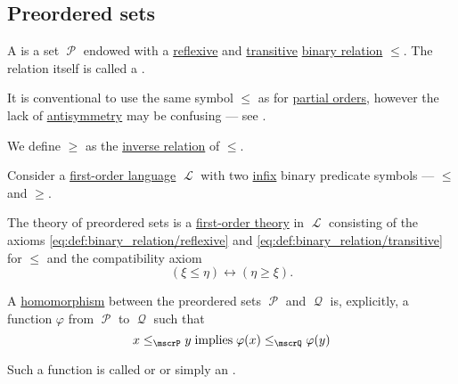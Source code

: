 \subsection{Preordered sets}\label{subsec:preordered_sets}

\begin{definition}\label{def:preordered_set}
  A  is a set \( \mscrP \) endowed with a \hyperref[def:binary_relation/reflexive]{reflexive} and \hyperref[def:binary_relation/transitive]{transitive} \hyperref[def:binary_relation]{binary relation} \( \leq \). The relation itself is called a .

  It is conventional to use the same symbol \( \leq \) as for \hyperref[def:poset]{partial orders}, however the lack of \hyperref[def:binary_relation/antisymmetric]{antisymmetry} may be confusing --- see .

  We define \( \geq \) as the \hyperref[def:binary_relation/inverse]{inverse relation} of \( \leq \).

  \begin{thmenum}[series=def:preordered_set]
     Consider a \hyperref[def:first_order_language]{first-order language} \( \mscrL \) with two \hyperref[rem:first_order_formula_conventions/infix]{infix} binary predicate symbols --- \( \leq \) and \( \geq \).

    The theory of preordered sets is a \hyperref[def:first_order_theory]{first-order theory} in \( \mscrL \) consisting of the axioms \eqref{eq:def:binary_relation/reflexive} and \eqref{eq:def:binary_relation/transitive} for \( \leq \) and the compatibility axiom
    \begin{equation}\label{eq:def:preordered_set/theory}
      (\xi \leq \eta) \leftrightarrow (\eta \geq \xi).
    \end{equation}

     A \hyperref[def:first_order_homomorphism]{homomorphism} between the preordered sets \( \mscrP \) and \( \mscrQ \) is, explicitly, a function \( \varphi \) from \( \mscrP \) to \( \mscrQ \) such that
    \begin{equation}\label{eq:def:preordered_set/homomorphism}
      x \leq_\mscrP y \T{implies} \varphi(x) \leq_\mscrQ \varphi(y)
    \end{equation}

    Such a function is called  or  or simply an .


\end{thmenum}
\end{definition}
